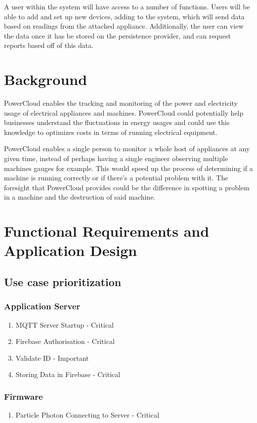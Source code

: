 \documentclass{article}
\begin{document}
	A user within the system will have access to a number of functions. Users will be able to add and set up new devices, adding to the system, which will send data based on readings from the attached appliance. Additionally, the user can view the data once it has be stored on the persistence provider, and can request reports based off of this data.
	\newpage
	\section{Background}
	PowerCloud enables the tracking and monitoring of the power and electricity 
	usage of electrical appliances and machines. PowerCloud could potentially help 
	businesses understand the fluctuations in energy usages and could use this 
	knowledge to optimizes costs in terms of running electrical equipment.
	
	PowerCloud enables a single person to monitor a whole host of appliances at any 
	given time, instead of perhaps having a single engineer observing multiple 
	machines gauges for example. This would speed up the process of determining if 
	a machine is running correctly or if there's a potential problem with it. The 
	foresight that PowerCloud provides could be the difference in spotting a 
	problem in a machine and the destruction of said machine.
	\newpage
	\section{Functional Requirements and Application Design}
	\subsection{Use case prioritization}
	\subsubsection{Application Server}
	\begin{enumerate}
		\item	MQTT Server Startup - Critical
		\item	Firebase Authorisation - Critical
		\item	Validate ID - Important
		\item	Storing Data in Firebase - Critical
	\end{enumerate}
	\subsubsection{Firmware}
	\begin{enumerate}
		\item	Particle Photon Connecting to Server - Critical
	\end{enumerate}
\end{document}
